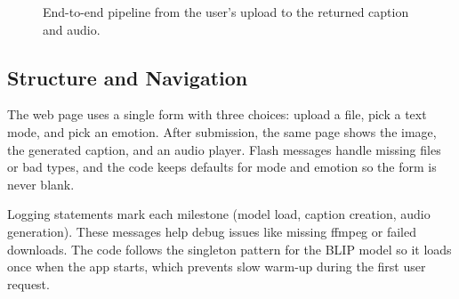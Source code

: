 \documentclass[11pt]{article}
\begin{document}
\begin{figure}[h]
    \centering
    \hspace*{-0.015\textwidth}%
    \caption{End-to-end pipeline from the user's upload to the returned caption and audio.}
    \label{fig:pipeline}
\end{figure}

\subsection{Structure and Navigation}
The web page uses a single form with three choices: upload a file, pick a text mode, and pick an emotion. After submission, the same page shows the image, the generated caption, and an audio player. Flash messages handle missing files or bad types, and the code keeps defaults for mode and emotion so the form is never blank.

Logging statements mark each milestone (model load, caption creation, audio generation). These messages help debug issues like missing ffmpeg or failed downloads. The code follows the singleton pattern for the BLIP model so it loads once when the app starts, which prevents slow warm-up during the first user request.
\end{document}
